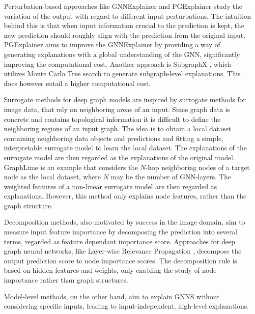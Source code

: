 Perturbation-based approaches like GNNExplainer \cite{ying2019gnnexplainer} and PGExplainer \cite{luo2020parameterized} study the variation of the output with regard to different input perturbations. The intuition behind this is that when input information crucial to the prediction is kept, the new prediction should roughly align with the prediction from the original input. PGExplainer aims to improve the GNNExplainer by providing a way of generating explanations with a global understanding of the GNN, significantly improving the computational cost. Another approach is SubgraphX \cite{yuan2021explainability}, which utilizes Monte Carlo Tree search to generate subgraph-level explanations. This does however entail a higher computational cost. 

Surrogate methods for deep graph models are inspired by surrogate methods for image data, that rely on neighboring areas of an input. Since graph data is concrete and contains topological information it is difficult to define the neighboring regions of an input graph. The idea is to obtain a local dataset containing neighboring data objects and predictions and fitting a simple, interpretable surrogate model to learn the local dataset. The explanations of the surrogate model are then regarded as the explanations of the original model. GraphLime \cite{huang2022graphlime} is an example that considers the $N$-hop neighboring nodes of a target node as the local dataset, where $N$ may be the number of GNN-layers. The weighted features of a non-linear surrogate model are then regarded as explanations. However, this method only explains node features, rather than the graph structure.

Decomposition methods, also motivated by success in the image domain, aim to measure input feature importance by decomposing the prediction into several terms, regarded as feature dependant importance score. Approaches for deep graph neural networks, like Layer-wise Relevance Propagation \cite{baldassarre2019explainability}, decompose the output prediction score to node importance scores. The decomposition rule is based on hidden features and weights, only enabling the study of node importance rather than graph structures.

Model-level methods, on the other hand, aim to explain GNNS without considering specific inputs, leading to input-independent, high-level explanations.


